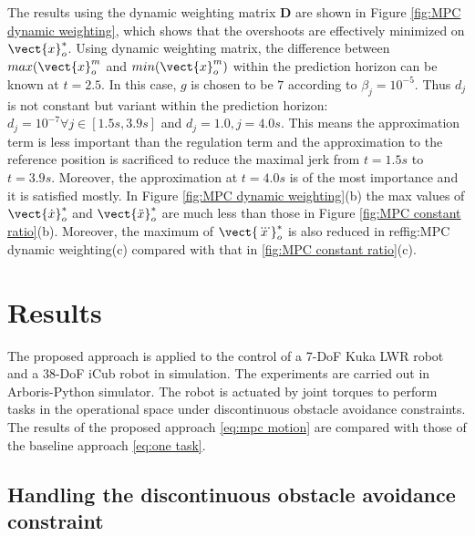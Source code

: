 The results using the dynamic weighting matrix $\mathbf{D}$ are shown in Figure \ref{fig:MPC dynamic weighting}, which shows that the overshoots are effectively minimized on $\vect{x}_{o}^*$. Using dynamic weighting matrix, the difference between $max(\vect{x}_o^{m}$ and $min(\vect{x}_o^{m})$ within the prediction horizon can be known at $t=2.5$. In this case, $g$ is chosen to be $7$ according to $\beta_j = 10^{-5}$. Thus $d_j$ is not constant but variant within the prediction horizon: $d_j=10^{-7} \forall j \in [1.5s, 3.9s]$ and $d_j = 1.0, j = 4.0s$. This means the approximation term is less important than the regulation term and the approximation to the reference position is sacrificed to reduce the maximal jerk from $t=1.5s$ to $t=3.9s$. Moreover, the approximation at $t=4.0s$ is of the most importance and it is satisfied mostly.  In Figure \ref{fig:MPC dynamic weighting}(b) the max values of $\vect{\dot{x}}_{o}^*$ and $\vect{\ddot{x}}_{o}^*$ are much less than those in Figure \ref{fig:MPC constant ratio}(b). Moreover, the maximum of $\vect{\dddot{x}}_o^*$ is also reduced in ref{fig:MPC dynamic weighting}(c) compared with that in \ref{fig:MPC constant ratio}(c).






\section{Results}
\label{sec:motion results}

The proposed approach is applied to the control of a 7-DoF Kuka LWR robot and a 38-DoF iCub robot in simulation. The experiments are carried out in Arboris-Python simulator. The robot is actuated by joint torques to perform tasks in the operational space under discontinuous obstacle avoidance constraints. The results of the proposed approach \eqref{eq:mpc motion} are compared with those of the baseline approach \eqref{eq:one task}. 

\subsection{Handling the discontinuous obstacle avoidance constraint}

